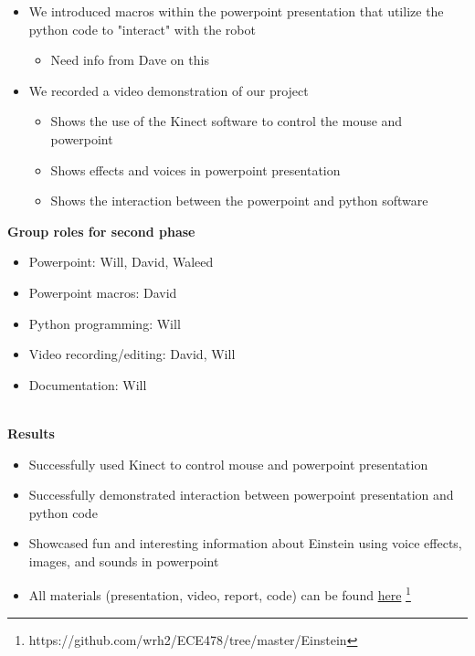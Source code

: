 \documentclass[12pt]{article}
\begin{document}
\begin{description}
\begin{itemize}
			\item We introduced macros within the powerpoint presentation that utilize the python code to "interact" with the robot
				\begin{itemize}
					\item Need info from Dave on this
				\end{itemize}
			\item We recorded a video demonstration of our project
				\begin{itemize}
					\item Shows the use of the Kinect software to control the mouse and powerpoint
					\item Shows effects and voices in powerpoint presentation
					\item Shows the interaction between the powerpoint and python software
				\end{itemize}
		\end{itemize}
		\textbf{Group roles for second phase}
		\begin{itemize}
			\item Powerpoint: Will, David, Waleed
			\item Powerpoint macros: David
			\item Python programming: Will
			\item Video recording/editing: David, Will
			\item Documentation: Will
		\end{itemize} \hfill \\
		\newpage
		\textbf{Results}
		\begin{itemize}
			\item Successfully used Kinect to control mouse and powerpoint presentation
			\item Successfully demonstrated interaction between powerpoint presentation and python code
			\item Showcased fun and interesting information about Einstein using voice effects, images, and sounds in powerpoint
			\item All materials (presentation, video, report, code) can be found \href{https://github.com/wrh2/ECE478/tree/master/Einstein}{here} \footnote{https://github.com/wrh2/ECE478/tree/master/Einstein}
		\end{itemize}
		
\end{description}
\end{document}

